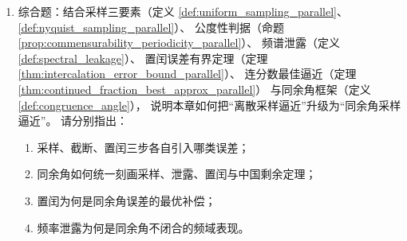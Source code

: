\begin{enumerate}[leftmargin=3em, label=\textbf{题 \arabic*}]
    \item 综合题：结合采样三要素（定义 \ref{def:uniform_sampling_parallel}、
    \ref{def:nyquist_sampling_parallel}）、
    公度性判据（命题 \ref{prop:commensurability_periodicity_parallel}）、
    频谱泄露（定义 \ref{def:spectral_leakage}）、
    置闰误差有界定理（定理 \ref{thm:intercalation_error_bound_parallel}）、
    连分数最佳逼近（定理 \ref{thm:continued_fraction_best_approx_parallel}）
    与同余角框架（定义 \ref{def:congruence_angle}），
    说明本章如何把“离散采样逼近”升级为“同余角采样逼近”。
    请分别指出：
    \begin{enumerate}[label=(\roman*)]
        \item 采样、截断、置闰三步各自引入哪类误差；
        \item 同余角如何统一刻画采样、泄露、置闰与中国剩余定理；
        \item 置闰为何是同余角误差的最优补偿；
        \item 频率泄露为何是同余角不闭合的频域表现。
    \end{enumerate}
\end{enumerate}

